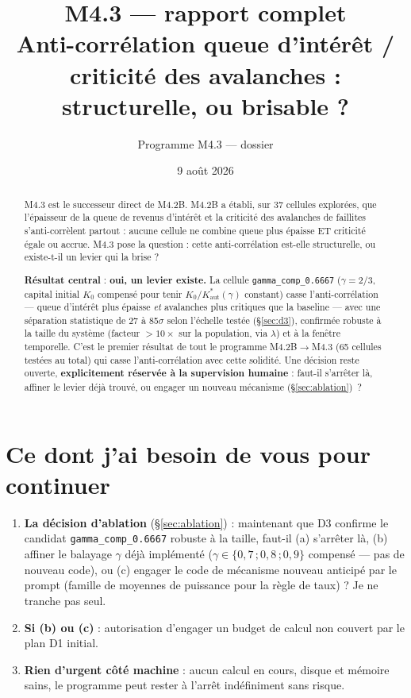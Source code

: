 \documentclass[11pt,a4paper]{article}
\title{M4.3 --- rapport complet\\
\large Anti-corrélation queue d'intérêt / criticité des avalanches :
structurelle, ou brisable ?}
\author{Programme M4.3 --- dossier \code{m4\_3\_credit\_soc}}
\date{9 août 2026}
\newcommand{\code}[1]{\texttt{#1}}
\newcommand{\Kaut}{K^{*}_{\mathrm{aut}}}
\begin{document}
\maketitle

\begin{abstract}
M4.3 est le successeur direct de M4.2B. M4.2B a établi, sur 37 cellules
explorées, que l'épaisseur de la queue de revenus d'intérêt et la
criticité des avalanches de faillites s'anti-corrèlent partout : aucune
cellule ne combine queue plus épaisse ET criticité égale ou accrue. M4.3
pose la question : cette anti-corrélation est-elle structurelle, ou
existe-t-il un levier qui la brise ?

\textbf{Résultat central} : \textbf{oui, un levier existe.} La cellule
\code{gamma\_comp\_0.6667} ($\gamma=2/3$, capital initial $K_0$ compensé
pour tenir $K_0/\Kaut(\gamma)$ constant) casse l'anti-corrélation ---
queue d'intérêt plus épaisse \emph{et} avalanches plus critiques que la
baseline --- avec une séparation statistique de 27 à 85$\sigma$ selon
l'échelle testée (\S\ref{sec:d3}), confirmée robuste à la taille du
système (facteur $>10\times$ sur la population, via $\lambda$) et à la
fenêtre temporelle. C'est le premier résultat de tout le programme
M4.2B$\to$M4.3 (65 cellules testées au total) qui casse l'anti-corrélation
avec cette solidité. Une décision reste ouverte, \textbf{explicitement
réservée à la supervision humaine} : faut-il s'arrêter là, affiner le
levier déjà trouvé, ou engager un nouveau mécanisme (\S\ref{sec:ablation})~?
\end{abstract}

\tableofcontents

\section*{Ce dont j'ai besoin de vous pour continuer}

\begin{enumerate}
\item \textbf{La décision d'ablation} (\S\ref{sec:ablation}) : maintenant
  que D3 confirme le candidat \code{gamma\_comp\_0.6667} robuste à la
  taille, faut-il (a) s'arrêter là, (b) affiner le balayage $\gamma$ déjà
  implémenté ($\gamma\in\{0{,}7\,;0{,}8\,;0{,}9\}$ compensé --- pas de
  nouveau code), ou (c) engager le code de mécanisme nouveau anticipé par
  le prompt (famille de moyennes de puissance pour la règle de taux) ?
  Je ne tranche pas seul.
\item \textbf{Si (b) ou (c)} : autorisation d'engager un budget de calcul
  non couvert par le plan D1 initial.
\item \textbf{Rien d'urgent côté machine} : aucun calcul en cours, disque
  et mémoire sains, le programme peut rester à l'arrêt indéfiniment sans
  risque.
\end{enumerate}
\end{document}
